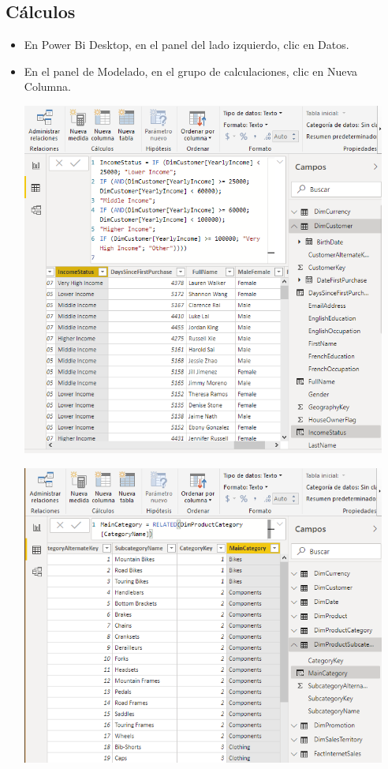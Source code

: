 \documentclass[12pt,letterpaper]{article}
\begin{document}
\subsection{Cálculos}
\begin{itemize}
	\item En Power Bi Desktop, en el panel del lado izquierdo, clic en Datos.
	\item En el panel de Modelado, en el grupo de calculaciones, clic en Nueva Columna.
\begin{center}
\includegraphics[width=12cm]{./Imagenes/5}
\end{center}
\begin{center}
\includegraphics[width=12cm]{./Imagenes/6}

\end{center}
\end{itemize}
\end{document}
